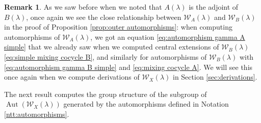 \documentclass[11pt, svgnames]{amsart}
\newcommand{\W}{\mathcal{W}}
\DeclareMathOperator{\Aut}{Aut}
\theoremstyle{definition}
\newtheorem{remark}[proposition]{Remark}
\begin{document}
\begin{remark}
    As we saw before when we noted that $A(\lambda)$ is the adjoint of $B(\lambda)$, once again we see the close relationship between $\W_A(\lambda)$ and $\W_B(\lambda)$ in the proof of Proposition \ref{prop:outer automorphisms}: when computing automorphisms of $\W_A(\lambda)$, we got an equation \eqref{eq:automorphism gamma A simple} that we already saw when we computed central extensions of $\W_B(\lambda)$ \eqref{eq:simple mixing cocycle B}, and similarly for automorphisms of $\W_B(\lambda)$ with \eqref{eq:automorphism gamma B simple} and \eqref{eq:mixing cocycle A}. We will see this once again when we compute derivations of $\W_X(\lambda)$ in Section \ref{sec:derivations}.
\end{remark}

The next result computes the group structure of the subgroup of $\Aut(\W_X(\lambda))$ generated by the automorphisms defined in Notation \ref{ntt:automorphisms}.
\end{document}

